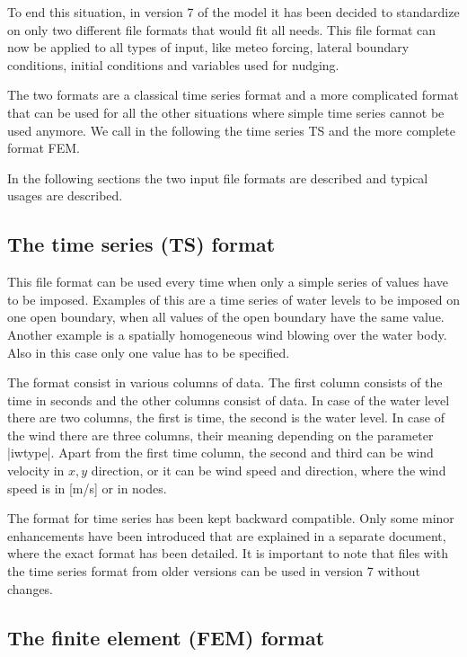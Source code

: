 \documentclass[12pt,draft]{article}
\begin{document}
To end this situation, in version 7 of the model
it has been decided to standardize
on only two different file formats that would fit all needs. This
file format can now be applied to all types of input, like meteo
forcing, lateral boundary conditions, initial conditions and 
variables used for nudging. 

The two formats are a classical time series format and a more
complicated format that can be used for all the other situations
where simple time series cannot be used anymore. We call in
the following the time series TS and the more 
complete format FEM. 

In the following sections the two input file formats are described
and typical usages are described.

\subsection{The time series (TS) format}

This file format can be used every time when only a simple
series of values have to be imposed. Examples of this are
a time series of water levels to be imposed on one
open boundary, when all values of the open boundary
have the same value. Another example is a spatially
homogeneous wind blowing over the water body. Also
in this case only one value has to be specified.

The format consist in various columns of data. The first column
consists of the time in seconds and the other columns
consist of data. In case of the water level there are two columns,
the first is time, the second is the water level. In case of
the wind there are three columns, their meaning depending on the
parameter |iwtype|. Apart from the first time column, the second and third can be wind velocity in $x,y$ direction, or it can be
wind speed and direction, where the wind speed is in [m/s]
or in nodes.

The format for time series has been kept backward compatible.
Only some minor enhancements have been introduced
that are explained in a separate document, where the exact 
format has been detailed. It is important to note that files
with the time series format from older versions can be used
in version 7 without changes.

\subsection{The finite element (FEM) format}
\end{document}
